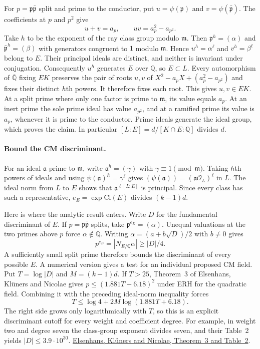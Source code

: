 For $p=\mathfrak p\bar{\mathfrak p}$ split and prime to the conductor,
put $u=\psi(\mathfrak p)$ and $v=\psi(\bar{\mathfrak p})$. The
coefficients at $p$ and $p^2$ give
\[
       u+v=a_p,\qquad uv=a_p^2-a_{p^2}.
\]
Take $h$ to be the exponent of the ray class group modulo $\mathfrak m$.
Then $\mathfrak p^h=(\alpha)$ and
$\bar{\mathfrak p}^{h}=(\beta)$ with generators congruent to $1$
modulo $\mathfrak m$. Hence $u^h=\alpha^\ell$ and $v^h=\beta^\ell$
belong to $E$. Their principal ideals are distinct, and neither is
invariant under conjugation. Consequently $u^h$ generates $E$ over
$\mathbb Q$, so $E\subset L$. Every automorphism of
$\overline{\mathbb Q}$ fixing $EK$ preserves the pair of roots $u,v$ of
$X^2-a_p X+(a_p^2-a_{p^2})$ and fixes their distinct $h$th powers.
It therefore fixes each root. This gives $u,v\in EK$. At a split prime
where only one factor is prime to $\mathfrak m$, its value equals $a_p$.
At an inert prime the sole prime ideal has value $a_{p^2}$, and at a
ramified prime its value is $a_p$, whenever it is prime to the conductor.
Prime ideals generate the ideal group, which proves the claim. In
particular $[L:E]=d/[K\cap E:\mathbb Q]$ divides $d$.

\paragraph{Bound the CM discriminant.}
For an ideal $\mathfrak a$ prime to $\mathfrak m$, write
$\mathfrak a^h=(\gamma)$ with $\gamma\equiv1\pmod{\mathfrak m}$.
Taking $h$th powers of ideals and using $\psi(\mathfrak a)^h=\gamma^\ell$
gives
$(\psi(\mathfrak a))=(\mathfrak a\mathcal O_L)^\ell$ in $L$.
The ideal norm from $L$ to $E$ shows that
$\mathfrak a^{\ell[L:E]}$ is principal. Since every class has such a
representative, $e_E=\exp\mathrm{Cl}(E)$ divides $(k-1)d$.

Here is where the analytic result enters. Write $D$ for the fundamental
discriminant of $E$. If $p=\mathfrak p\bar{\mathfrak p}$ splits, take
$\mathfrak p^{e_E}=(\alpha)$. Unequal valuations at the two primes above
$p$ force $\alpha\notin\mathbb Q$. Writing
$\alpha=(a+b\sqrt D)/2$ with $b\ne0$ gives
\[
       p^{e_E}=|N_{E/\mathbb Q}\alpha|\geq |D|/4 .
\]
A sufficiently small split prime therefore bounds the discriminant of every possible $E$.
A numerical version gives a test for an individual proposed CM field. Put
$T=\log|D|$ and $M=(k-1)d$. If $T>25$, Theorem~3 of Elsenhans,
Kl\"uners and Nicolae gives $p\leq(1.881T+6.18)^2$ under ERH for the
quadratic field. Combining it with the preceding ideal-norm inequality
forces
\[
               T\leq\log 4+2M\log(1.881T+6.18).
\]
The right side grows only logarithmically with $T$, so this is an
explicit discriminant cutoff for every weight and coefficient degree.
For example, in weight two and degree seven the class-group exponent
divides seven, and their Table~2 yields $|D|\leq 3.9\cdot10^{30}$.
\href{https://arxiv.org/pdf/1803.02056}{Elsenhans, Kl\"uners and Nicolae, Theorem~3 and Table~2}.

